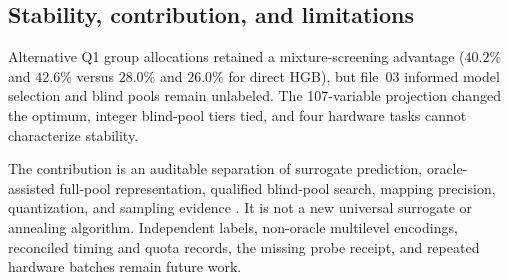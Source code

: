 \subsection{Stability, contribution, and limitations}

Alternative Q1 group allocations retained a mixture-screening advantage
($40.2\%$ and $42.6\%$ versus $28.0\%$ and $26.0\%$ for direct HGB), but
file~03 informed model selection and blind pools remain unlabeled.  The
107-variable projection changed the optimum, integer blind-pool tiers tied,
and four hardware tasks cannot characterize stability.

The contribution is an auditable separation of surrogate prediction,
oracle-assisted full-pool representation, qualified blind-pool search,
mapping precision, quantization, and sampling evidence
\cite{Ward2016Magpie,Chen2024PerovskiteML,Lucas2014IsingNP,Glover2019QUBOTutorial}.
It is not a new universal surrogate or annealing algorithm.  Independent
labels, non-oracle multilevel encodings, reconciled timing and quota records,
the missing probe receipt, and repeated hardware batches remain future work.
